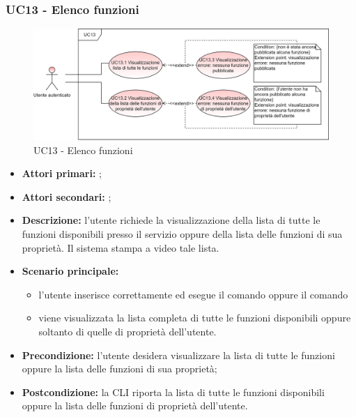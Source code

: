\subsubsection{UC13 - Elenco funzioni}
\begin{figure}[h]
	\centering
	\includegraphics[scale=\ucs]{./res/img/UC13.png}
	\caption {UC13 - Elenco funzioni}
\end{figure}
\begin{itemize}
	\item \textbf{Attori primari:} \ua{};
	\item \textbf{Attori secondari:} \re{};
	\item \textbf{Descrizione:} l’utente richiede la visualizzazione della lista di tutte le funzioni disponibili presso il servizio oppure della lista delle funzioni di sua proprietà. Il sistema stampa a video tale lista.
	\item \textbf{Scenario principale:} 
	\begin{itemize}
		\item l'utente inserisce correttamente ed esegue il comando \lista{} oppure il comando \plista{}
		\item viene visualizzata la lista completa di tutte le funzioni disponibili oppure soltanto di quelle di proprietà dell’utente. 
	\end{itemize}
	\item \textbf{Precondizione:} l’utente desidera visualizzare la lista di tutte le funzioni oppure la lista delle funzioni di sua proprietà;
	\item \textbf{Postcondizione:} la CLI riporta la lista di tutte le funzioni disponibili oppure la lista delle funzioni di proprietà dell’utente.
\end{itemize}